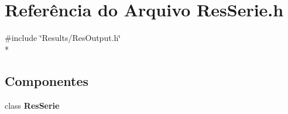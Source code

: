 \section{Referência do Arquivo Res\+Serie.\+h}
\label{_res_serie_8h}
{\ttfamily \#include \char`\"{}Results/\+Res\+Output.\+h\char`\"{}}\\*
\subsection*{Componentes}
\begin{DoxyCompactItemize}
\item 
class {\bf Res\+Serie}
\end{DoxyCompactItemize}
